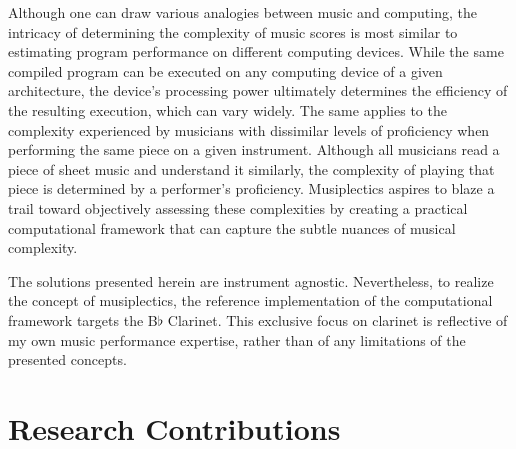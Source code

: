\documentclass[12pt]{report}
\begin{document}
Although one can draw various analogies between music and computing, the intricacy of determining the complexity of music scores is most similar to estimating program performance on different computing devices. While the same compiled program can be executed on any computing device of a given architecture, the device's processing power ultimately determines the efficiency of the resulting execution, which can vary widely. The same applies to the complexity experienced by musicians with dissimilar levels of proficiency when performing the same piece on a given instrument. Although all musicians read a piece of sheet music and understand it similarly, the complexity of playing that piece is determined by a performer's proficiency. Musiplectics aspires to blaze a trail toward objectively assessing these complexities by creating a practical computational framework that can capture the subtle nuances of musical complexity.

The solutions presented herein are instrument agnostic. Nevertheless, to realize the concept of musiplectics, the reference implementation of the computational framework targets the B$\flat$ Clarinet. This exclusive focus on clarinet is reflective of my own music performance expertise, rather than of any limitations of the presented concepts.

\section{Research Contributions} 
\label{sec:rqg}




\end{document}
